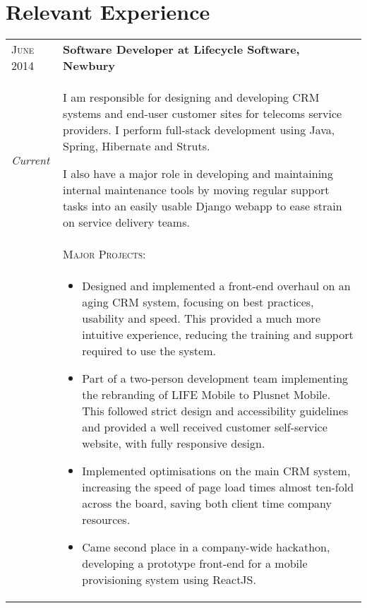 \section{Relevant Experience}
\begin{tabular}{p{60pt}|p{11cm}}
	\hspace*{\fill}\textsc{June 2014} & \textbf{Software Developer at Lifecycle Software, Newbury} \\
	
	\hspace*{\fill}\emph{Current} & \small{
		I am responsible for designing and developing CRM systems and end-user customer sites for telecoms service providers. I perform full-stack development using Java, Spring, Hibernate and Struts.

		I also have a major role in developing and maintaining internal maintenance tools by moving regular support tasks into an easily usable Django webapp to ease strain on service delivery teams.
	} \\

	\ & \vspace{1pt}\textsc{Major Projects}: \\

	&\vspace{-0.9em}\begin{itemize}[itemsep=0pt,topsep=0pt,leftmargin=*]\small
		\item Designed and implemented a front-end overhaul on an aging CRM system, focusing on best practices, usability and speed. This provided a much more intuitive experience, reducing the training and support required to use the system.
		\item Part of a two-person development team implementing the rebranding of LIFE Mobile to Plusnet Mobile. This followed strict design and accessibility guidelines and provided a well received customer self-service website, with fully responsive design. 
		\item Implemented optimisations on the main CRM system, increasing the speed of page load times almost ten-fold across the board, saving both client time company resources.
		\item Came second place in a company-wide hackathon, developing a prototype front-end for a mobile provisioning system using ReactJS.
	\end{itemize}\vspace{-1.5em}

\end{tabular}